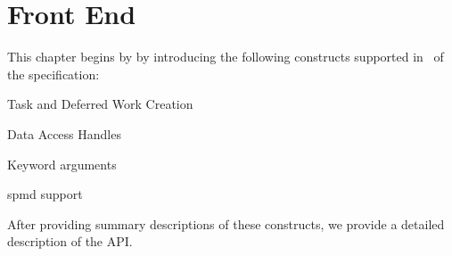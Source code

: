 
\chapter{Front End}
\label{chap:front_end}

This chapter begins by by introducing the following constructs supported in
\specVersion\ of the specification:
\begin{compactitem}
\item Task and Deferred Work Creation
\item Data Access Handles
\item Keyword arguments
\item \gls{spmd} support
\end{compactitem}
After providing summary descriptions of these constructs, we provide a detailed description of the
\gls{API}.





%













